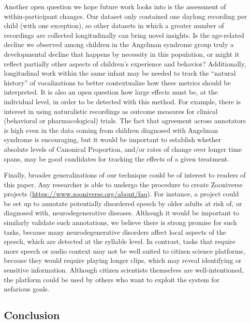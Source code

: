 \documentclass[
  english,
  ,man]{apa6}
\begin{document}
Another open question we hope future work looks into is the assessment of within-participant changes. Our dataset only contained one daylong recording per child (with one exception), so other datasets in which a greater number of recordings are collected longitudinally can bring novel insights. Is the age-related decline we observed among children in the Angelman syndrome group truly a developmental decline that happens by necessity in this population, or might it reflect partially other aspects of children's experience and behavior? Additionally, longitudinal work within the same infant may be needed to track the ``natural history'' of vocalizations to better contextualize how these metrics should be interpreted. It is also an open question how large effects must be, at the individual level, in order to be detected with this method. For example, there is interest in using naturalistic recordings as outcome measures for clinical (behavioral or pharmacological) trials. The fact that agreement across annotators is high even in the data coming from children diagnosed with Angelman syndrome is encouraging, but it would be important to establish whether absolute levels of Canonical Proportion, and/or rates of change over longer time spans, may be good candidates for tracking the effects of a given treatment.

Finally, broader generalizations of our technique could be of interest to readers of this paper. Any researcher is able to undergo the procedure to create Zooniverse projects (\url{https://www.zooniverse.org/about/faq}). For instance, a project could be set up to annotate potentially disordered speech by older adults at risk of, or diagnosed with, neurodegenerative diseases. Although it would be important to similarly validate such annotations, we believe there is strong promise for such tasks, because many neurodegenerative disorders affect local aspects of the speech, which are detected at the syllable level. In contrast, tasks that require more speech or audio context may not be well suited to citizen science platforms, because they would require playing longer clips, which may reveal identifying or sensitive information. Although citizen scientists themselves are well-intentioned, the platform could be used by others who want to exploit the system for nefarious goals.

\hypertarget{conclusion}{%
\subsection{Conclusion}\label{conclusion}}
\end{document}
